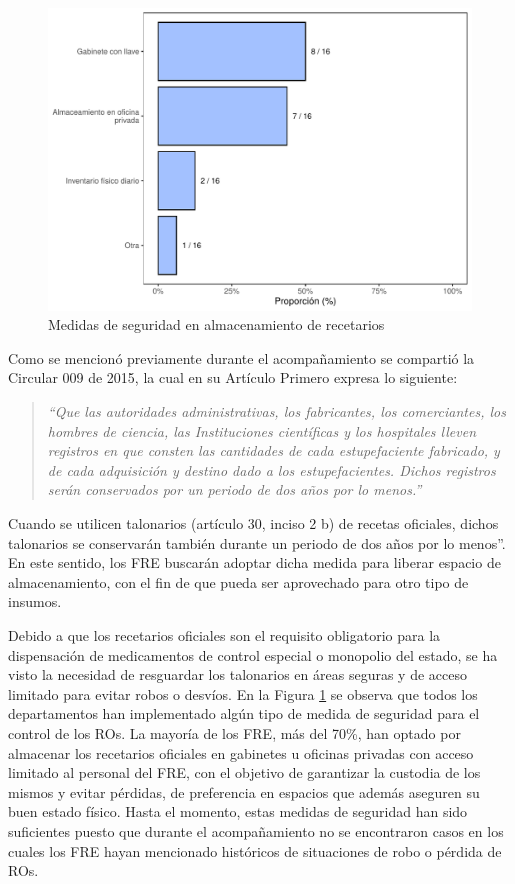 \documentclass[
]{book}
\begin{document}
\begin{figure}
\includegraphics[width=0.85\linewidth]{InformeFinal_files/figure-latex/MedidasSeguridad-Almacenamiento-1} \caption{Medidas de seguridad en almacenamiento de recetarios}\label{fig:MedidasSeguridad-Almacenamiento}
\end{figure}

Como se mencionó previamente durante el acompañamiento se compartió la Circular 009 de 2015, la cual en su Artículo Primero expresa lo siguiente:

\begin{quote}
\emph{``Que las autoridades administrativas, los fabricantes, los comerciantes, los hombres de ciencia, las Instituciones científicas y los hospitales lleven registros en que consten las cantidades de cada estupefaciente fabricado, y de cada adquisición y destino dado a los estupefacientes. Dichos registros serán conservados por un periodo de dos años por lo menos.''}
\end{quote}

Cuando se utilicen talonarios (artículo 30, inciso 2 b) de recetas oficiales, dichos talonarios se conservarán también durante un periodo de dos años por lo menos''. En este sentido, los FRE buscarán adoptar dicha medida para liberar espacio de almacenamiento, con el fin de que pueda ser aprovechado para otro tipo de insumos.

Debido a que los recetarios oficiales son el requisito obligatorio para la dispensación de medicamentos de control especial o monopolio del estado, se ha visto la necesidad de resguardar los talonarios en áreas seguras y de acceso limitado para evitar robos o desvíos. En la Figura \ref{fig:MedidasSeguridad-Almacenamiento} se observa que todos los departamentos han implementado algún tipo de medida de seguridad para el control de los ROs. La mayoría de los FRE, más del 70\%, han optado por almacenar los recetarios oficiales en gabinetes u oficinas privadas con acceso limitado al personal del FRE, con el objetivo de garantizar la custodia de los mismos y evitar pérdidas, de preferencia en espacios que además aseguren su buen estado físico. Hasta el momento, estas medidas de seguridad han sido suficientes puesto que durante el acompañamiento no se encontraron casos en los cuales los FRE hayan mencionado históricos de situaciones de robo o pérdida de ROs.
\end{document}
